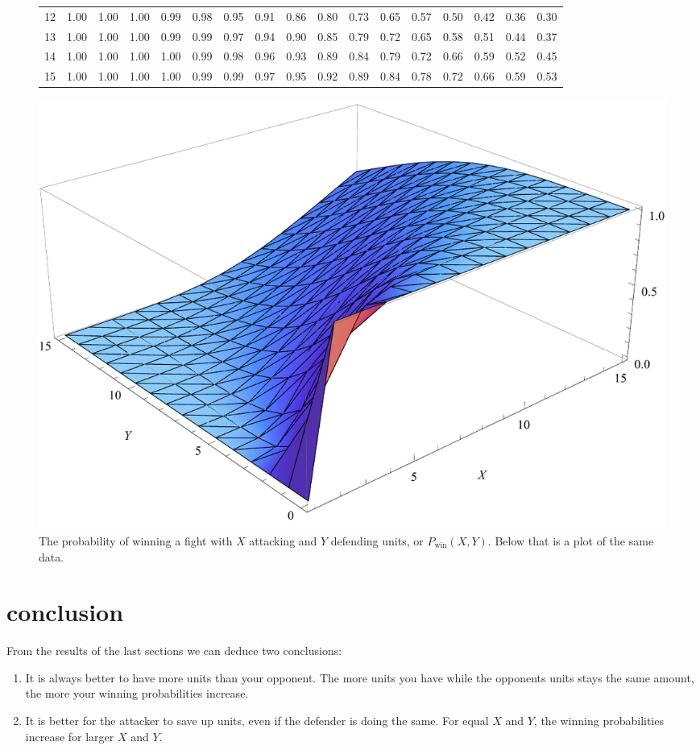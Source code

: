 \documentclass{amsart}
\begin{document}
\begin{figure}
{\begin{tabular}{c||cccccccccccccccc}
12   &    1.00 &   1.00 &   1.00 &   0.99 &   0.98 &   0.95 &   0.91 &   0.86 &   0.80 &   0.73 &   0.65 &   0.57 &   0.50 &   0.42 &   0.36 &   0.30 \\ 
13   &    1.00 &   1.00 &   1.00 &   0.99 &   0.99 &   0.97 &   0.94 &   0.90 &   0.85 &   0.79 &   0.72 &   0.65 &   0.58 &   0.51 &   0.44 &   0.37 \\ 
14   &    1.00 &   1.00 &   1.00 &   1.00 &   0.99 &   0.98 &   0.96 &   0.93 &   0.89 &   0.84 &   0.79 &   0.72 &   0.66 &   0.59 &   0.52 &   0.45 \\ 
15   &    1.00 &   1.00 &   1.00 &   1.00 &   0.99 &   0.99 &   0.97 &   0.95 &   0.92 &   0.89 &   0.84 &   0.78 &   0.72 &   0.66 &   0.59 &   0.53 \\
	\end{tabular}}
	
	\includegraphics[scale=0.6]{Plot}
	
	\caption{The probability of winning a fight with $X$ attacking and $Y$ defending units, or $P_\text{win}(X,Y)$. Below that is a plot of the same data.} \label{fig:4}
	\end{figure}
	
	\section{conclusion}
	
	From the results of the last sections we can deduce two conclusions:
	\begin{enumerate}
		\item It is always better to have more units than your opponent. The more units you have while the opponents units stays the same amount, the more your winning probabilities increase.
	
		\item It is better for the attacker to save up units, even if the defender is doing the same. For equal $X$ and $Y$, the winning probabilities increase for larger $X$ and $Y$. 
	\end{enumerate}
	
\end{document}
